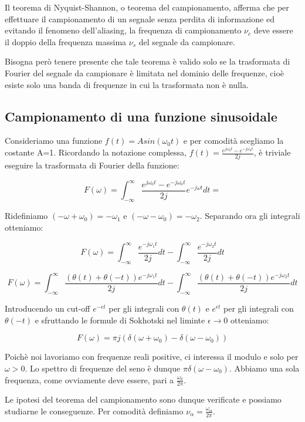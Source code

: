 Il teorema di Nyquist-Shannon, o teorema del campionamento, afferma che per effettuare il campionamento di un segnale senza perdita di informazione ed evitando il fenomeno dell'aliasing, la frequenza di campionamento $\nu_c$ deve essere il doppio della frequenza massima $\nu_s$ del segnale da campionare.

Bisogna però tenere presente che tale teorema è valido solo se la trasformata di Fourier del segnale da campionare è limitata nel dominio delle frequenze, cioè esiste solo una banda di frequenze in cui la trasformata non è nulla.

\subsection{Campionamento di una funzione sinusoidale}

Consideriamo una funzione $f(t)=Asin(\omega_0 t)$ e per comodità scegliamo la costante A=1. Ricordando la notazione complessa, $f(t)=\frac{e^{j\omega_0 t}-e^{-j\omega_0 t}}{2j}$, è triviale eseguire la trasformata di Fourier della funzione:

$$F(\omega)=\int_{-\infty}^{\infty} \frac{e^{j\omega_0 t}-e^{-j\omega_0 t}}{2j}e^{-j\omega t} dt=$$

Ridefiniamo $(-\omega + \omega_0)=-\omega_1$ e $(-\omega - \omega_0)=-\omega_2$. Separando ora gli integrali otteniamo:

$$F(\omega)=\int_{-\infty}^{\infty} \frac{e^{-j\omega_1 t}}{2j}dt - \int_{-\infty}^{\infty} \frac{e^{-j\omega_2 t}}{2j}dt$$

$$F(\omega)=\int_{-\infty}^{\infty} \frac{(\theta(t)+\theta(-t)) e^{-j\omega_1 t}}{2j}dt - \int_{-\infty}^{\infty} \frac{(\theta(t)+\theta(-t))e^{-j\omega_2 t}}{2j}dt$$


Introducendo un cut-off $e^{-\epsilon t}$ per gli integrali con $\theta(t)$ e $e^{\epsilon t}$ per gli integrali con $\theta(-t)$ e sfruttando le formule di Sokhotski nel liminte $\epsilon \rightarrow 0$ otteniamo:

$$F(\omega)=\pi j (\delta(\omega + \omega_0) - \delta(\omega - \omega_0))$$

Poichè noi lavoriamo con frequenze reali positive, ci interessa il modulo e solo per $\omega > 0$. Lo spettro di frequenze del seno è dunque $\pi \delta(\omega-\omega_0)$. Abbiamo una sola frequenza, come ovviamente deve essere, pari a $\frac{\omega_0}{2\pi}$. 

Le ipotesi del teorema del campionamento sono dunque verificate e possiamo studiarne le conseguenze. Per comodità definiamo $\nu_{\alpha}=\frac{\omega_{\alpha}}{2\pi}$.

